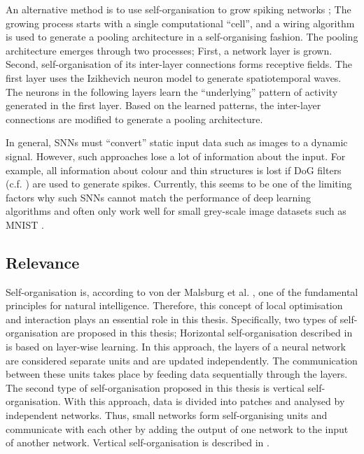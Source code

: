 An alternative method is to use self-organisation to grow spiking networks ; The growing process starts with a single computational ``cell'', and a wiring algorithm is used to generate a pooling architecture in a self-organising fashion.
The pooling architecture emerges through two processes; First, a network layer is grown. Second, self-organisation of its inter-layer connections forms receptive fields.
The first layer uses the Izikhevich neuron model  to generate spatiotemporal waves.
The neurons in the following layers learn the ``underlying'' pattern of activity generated in the first layer. 
Based on the learned patterns, the inter-layer connections are modified to generate a pooling architecture.

In general, SNNs must ``convert'' static input data such as images to a dynamic signal. However, such approaches lose a lot of information about the input.
For example, all information about colour and thin structures is lost if DoG filters (c.f. ) are used to generate spikes.
Currently, this seems to be one of the limiting factors why such SNNs cannot match the performance of deep learning algorithms and often only work well for small grey-scale image datasets such as MNIST \cite{lecun_gradient-based_1998}.



\subsection{Relevance}
Self-organisation is, according to von der Malsburg et al. , one of the fundamental principles for natural intelligence.
Therefore, this concept of local optimisation and interaction plays an essential role in this thesis.
Specifically, two types of self-organisation are proposed in this thesis;
Horizontal self-organisation described in  is based on layer-wise learning. In this approach, the layers of a neural network are considered separate units and are updated independently.
The communication between these units takes place by feeding data sequentially through the layers.
The second type of self-organisation proposed in this thesis is vertical self-organisation. With this approach, data is divided into patches and analysed by independent networks. Thus, small networks form self-organising units and communicate with each other by adding the output of one network to the input of another network.
Vertical self-organisation is described in .


